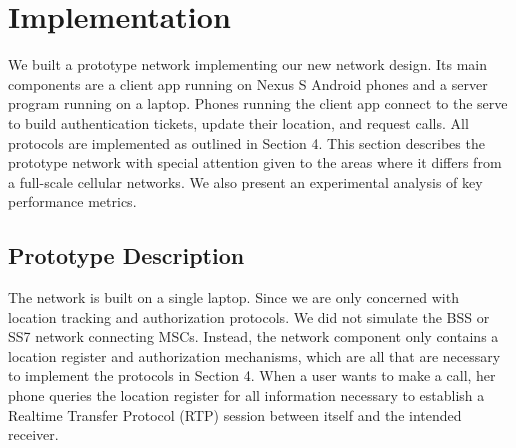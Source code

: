\documentclass[11pt]{article}
\begin{document}



\section{Implementation}
We built a prototype network implementing our new network design. Its main components are a client app running on Nexus S Android phones and a server program running on a laptop. Phones running the client app connect to the serve to build authentication tickets, update their location, and request calls. All protocols are implemented as outlined in Section 4. This section describes the prototype network with special attention given to the areas where it differs from a full-scale cellular networks. We also present an experimental analysis of key performance metrics.

\subsection{Prototype Description}
The network is built on a single laptop. Since we are only concerned with location tracking and authorization protocols. We did not simulate the BSS or SS7 network connecting MSCs. Instead, the network component only contains a location register and authorization mechanisms, which are all that are necessary to implement the protocols in Section 4. When a user wants to make a call, her phone queries the location register for all information necessary to establish a Realtime Transfer Protocol (RTP) session between itself and the intended receiver.
\end{document}
